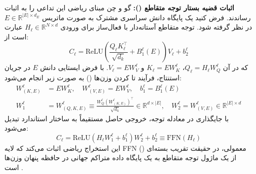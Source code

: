 \textbf{اثبات قضیه بستار توجه متقاطع ():}
گو و چن \cite{guo2025decoupling} مبنای ریاضی این تداعی را به اثبات رساندند. فرض کنید یک پایگاه دانش سراسری مشترک به صورت ماتریس $E \in \mathbb{R}^{|E| \times d_E}$ در نظر گرفته شود. توجه متقاطع آستانه‌دار با فعال‌ساز  برای ورودی $H_\ell \in \mathbb{R}^{N \times d}$ عبارت است از:
\begin{equation}
    C_\ell = \text{ReLU}\left( \frac{Q_\ell K_\ell^\top}{\sqrt{d_k}} + B_1^\ell(E) \right) V_\ell + b_2^\ell
\end{equation}
که در آن $Q_\ell = H_\ell W_Q^\ell$، $K_\ell = E W_K^\ell$ و $V_\ell = E W_V^\ell$. با فرض ایستایی دانش $E$ در جریان استنتاج، فرآیند تا کردن وزن‌ها () به صورت زیر انجام می‌شود:
\begin{align}
    W_{(K, E)}^\ell &= E W_K^\ell, \quad W_{(V, E)}^\ell = E W_V^\ell, \quad b_1^\ell = B_1^\ell(E) \\
    W_1^\ell &= W_{(Q, K, E)}^\ell \equiv \frac{W_Q^\ell (W_{(K, E)}^\ell)^\top}{\sqrt{d_k}} \in \mathbb{R}^{d \times |E|}, \quad W_2^\ell = W_{(V, E)}^\ell \in \mathbb{R}^{|E| \times d}
\end{align}
با جایگذاری در معادله توجه، خروجی حاصل مستقیماً به ساختار  استاندارد تبدیل می‌شود:
\begin{equation}
    C_\ell = \text{ReLU}\left( H_\ell W_1^\ell + b_1^\ell \right) W_2^\ell + b_2^\ell \equiv \text{FFN}(H_\ell)
\end{equation}
این استخراج ریاضی اثبات می‌کند که لایه FFN معمولی، در حقیقت تقریب بسته‌ای () از یک ماژول توجه متقاطع به یک پایگاه داده متراکم جهانی در حافظه پنهان وزن‌ها است \cite{guo2025decoupling}.

